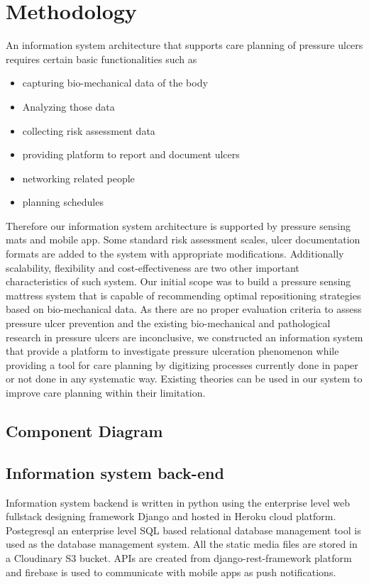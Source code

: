 \chapter{Methodology}
\label{chapter:method}

An information system architecture that supports care planning of pressure ulcers requires certain basic functionalities such as 
\begin{itemize}
	\item capturing bio-mechanical data of the body
	\item Analyzing those data
	\item collecting risk assessment data
	\item providing platform to report and document ulcers
	\item networking related people
	\item planning schedules
\end{itemize}

Therefore our information system architecture is supported by pressure sensing mats and mobile app. Some standard risk assessment scales, ulcer documentation formats are added to the system with appropriate modifications. Additionally scalability, flexibility and cost-effectiveness are two other important characteristics of such system. Our initial scope was to build a pressure sensing mattress system that is capable of recommending optimal repositioning strategies based on bio-mechanical data. As there are no proper evaluation criteria to assess pressure ulcer  prevention and the existing bio-mechanical and pathological research in pressure ulcers are inconclusive, we constructed an information system that provide a platform to investigate pressure ulceration phenomenon while providing a tool for care planning by digitizing processes currently done in paper or not done in any systematic way. Existing theories can be used in our system to improve care planning within their limitation.

\section{Component Diagram}




\section{Information system back-end}


Information system backend is written in python using the enterprise level web fullstack designing framework Django and hosted in Heroku cloud platform. Postegresql an enterprise level SQL based relational database management tool is used as the database management system. All the static media files are stored in a Cloudinary S3 bucket. APIs are created from django-rest-framework platform and firebase is used to communicate with mobile apps as push notifications. 


